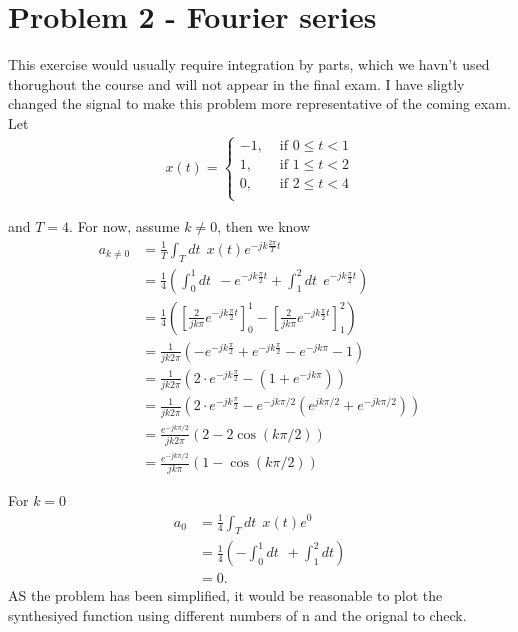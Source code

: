 \section*{Problem 2 - Fourier series}
This exercise would usually require integration by parts, which we havn't used 
thorughout the course and will not appear in the final exam. I have sligtly 
changed the signal to make this problem more representative of the coming exam.
Let 
\begin{align}
    x(t) = \begin{cases}
        -1, &\text{ if }0\leq t < 1\\
        1, &\text{ if }1\leq t < 2\\
        0, &\text{ if }2\leq t < 4\\        
    \end{cases}
\end{align}

and $T = 4$. For now, assume $k\neq 0$, then we know 
\begin{align}
    a_{k\neq 0} &= \frac{1}{T}\int_T dt \ \ x(t)e^{-jk\frac{2\pi}{T}t}\\
        &= \frac{1}{4} \left(\int_0^1 dt \ \ - e^{-jk\frac{\pi}{2}t} 
            + \int_1^2 dt \ \ e^{-jk\frac{\pi}{2}t}\right)\\
        &= \frac{1}{4}\left(\left[\frac{2}{jk\pi}
            e^{-jk\frac{\pi}{2}t}\right]_0^1
            -\left[\frac{2}{jk\pi} e^{-jk\frac{\pi}{2}t}\right]
        _1^2 \right)\\
        &= \frac{1}{jk2\pi}\left(  - e^{-jk\frac{\pi}{2}}
        + e^{-jk\frac{\pi}{2}} - e^{-jk\pi} - 1\right)\\
        &= \frac{1}{jk2\pi}\left(  2\cdot e^{-jk\frac{\pi}{2}}
        - (1 + e^{-jk\pi})\right)\\
        &= \frac{1}{jk2\pi}\left(2\cdot e^{-jk\frac{\pi}{2}} 
        - e^{-jk\pi/2}(e^{jk\pi/2} + e^{-jk\pi/2})\right)\\
        &= \frac{e^{-jk\pi/2}}{jk2\pi}\left( 2 - 2\cos(k\pi/2)\right)\\
        &= \frac{e^{-jk\pi/2}}{jk\pi}\left(1- \cos(k\pi/2)\right)
\end{align}

For $k=0$
\begin{align}
    a_0 &= \frac{1}{4}\int_T dt \ \ x(t)e^{0}\\
        &= \frac{1}{4}\left( -\int_0^1 dt \ \ + \int_1^2 dt\right)\\ 
        &= 0.
\end{align}
AS the problem has been simplified, it would be reasonable to plot the 
synthesiyed function using different numbers of n and the orignal to check.

